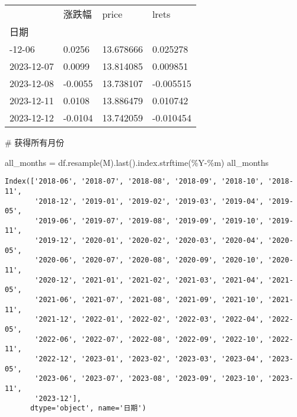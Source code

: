 \documentclass[
  letterpaper,
  DIV=11,
  numbers=noendperiod]{scrreprt}
\newenvironment{Shaded}{\begin{snugshade}}{\end{snugshade}}
\newcommand{\CommentTok}[1]{\textcolor[rgb]{0.37,0.37,0.37}{#1}}
\newcommand{\NormalTok}[1]{\textcolor[rgb]{0.00,0.23,0.31}{#1}}
\newcommand{\OperatorTok}[1]{\textcolor[rgb]{0.37,0.37,0.37}{#1}}
\newcommand{\StringTok}[1]{\textcolor[rgb]{0.13,0.47,0.30}{#1}}
\begin{document}
\begin{longtable}[]{@{}llll@{}}
\toprule\noalign{}
& 涨跌幅 & price & lrets \\
日期 & & & \\
\midrule\noalign{}
\endhead
\bottomrule\noalign{}
\endlastfoot
2023-12-06 & 0.0256 & 13.678666 & 0.025278 \\
2023-12-07 & 0.0099 & 13.814085 & 0.009851 \\
2023-12-08 & -0.0055 & 13.738107 & -0.005515 \\
2023-12-11 & 0.0108 & 13.886479 & 0.010742 \\
2023-12-12 & -0.0104 & 13.742059 & -0.010454 \\
\end{longtable}

\begin{Shaded}
\begin{Highlighting}[]
\CommentTok{\# 获得所有月份}

\NormalTok{all\_months }\OperatorTok{=}\NormalTok{ df.resample(}\StringTok{\textquotesingle{}M\textquotesingle{}}\NormalTok{).last().index.strftime(}\StringTok{\textquotesingle{}\%Y{-}\%m\textquotesingle{}}\NormalTok{)}
\NormalTok{all\_months}
\end{Highlighting}
\end{Shaded}

\begin{verbatim}
Index(['2018-06', '2018-07', '2018-08', '2018-09', '2018-10', '2018-11',
       '2018-12', '2019-01', '2019-02', '2019-03', '2019-04', '2019-05',
       '2019-06', '2019-07', '2019-08', '2019-09', '2019-10', '2019-11',
       '2019-12', '2020-01', '2020-02', '2020-03', '2020-04', '2020-05',
       '2020-06', '2020-07', '2020-08', '2020-09', '2020-10', '2020-11',
       '2020-12', '2021-01', '2021-02', '2021-03', '2021-04', '2021-05',
       '2021-06', '2021-07', '2021-08', '2021-09', '2021-10', '2021-11',
       '2021-12', '2022-01', '2022-02', '2022-03', '2022-04', '2022-05',
       '2022-06', '2022-07', '2022-08', '2022-09', '2022-10', '2022-11',
       '2022-12', '2023-01', '2023-02', '2023-03', '2023-04', '2023-05',
       '2023-06', '2023-07', '2023-08', '2023-09', '2023-10', '2023-11',
       '2023-12'],
      dtype='object', name='日期')
\end{verbatim}
\end{document}
